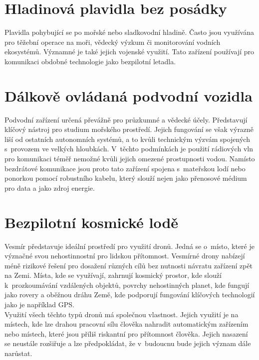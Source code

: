 \documentclass[12pt]{report}
\begin{document}
\section[Hladinová plavidla bez posádky]{Hladinová plavidla bez posádky}
Plavidla pohybující se po mořské nebo sladkovodní hladině. Často jsou využívána pro těžební operace na moři, vědecký výzkum či monitorování vodních ekosystémů. Významné je také jejich vojenské využití. Tato zařízení používají pro komunikaci obdobné technologie jako bezpilotní letadla. \cite{mainbook}

\section[Dálkově ovládaná podvodní vozidla]{Dálkově ovládaná podvodní vozidla}
Podvodní zařízení určená převážně pro průzkumné a vědecké účely. Představují klíčový nástroj pro studium mořského prostředí. Jejich fungování se však výrazně liší od ostatních autonomních systémů, a to kvůli technickým výzvám spojených s~provozem ve velkých hloubkách. V~těchto podmínkách je použití rádiových vln pro komunikaci téměř nemožné kvůli jejich omezené prostupnosti vodou. Namísto bezdrátové komunikace jsou proto tato zařízení spojena s~mateřskou lodí nebo ponorkou pomocí robustního kabelu, který slouží nejen jako přenosové médium pro data a jako zdroj energie. \cite{mainbook}

\section[Bezpilotní kosmické lodě]{Bezpilotní kosmické lodě}
Vesmír představuje ideální prostředí pro využití dronů. Jedná se o~místo, které je význačné svou nehostinnostní pro lidskou přítomnost. Vesmírné drony nabízejí méně rizikové řešení pro dosažení různých cílů bez nutnosti návratu zařízení zpět na Zemi. Místa, kde se využívají, zahrnují kosmický prostor, kde slouží k~prozkoumávání vzdálených objektů, povrchy nehostinných planet, kde fungují jako rovery a oběžnou dráhu Země, kde podporují fungování klíčových technologií jako je například GPS. \cite{mainbook}\\

Využití všech těchto typů dronů má společnou vlastnost. Jejich využití je na místech, kde lze drahou pracovní sílu člověka nahradit automatickým zařízením nebo místech, které jsou příliš riskantní pro přítomnost člověka. Jejich nasazení se neustále rozšiřuje a lze předpokládat, že v~budoucnu bude jejich význam dále narůstat.
\end{document}
